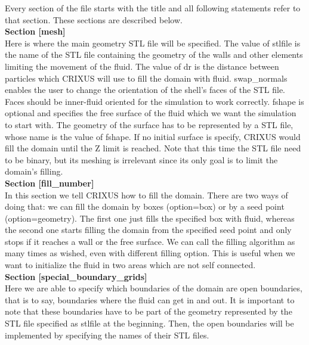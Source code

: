 Every section of the file starts with the title \cmd{[XXX]} 
and all following statements refer to that section.
These sections are described below.\\

\textbf{Section [mesh]}\\
Here is where the main geometry STL file will be specified. 
The value of stlfile is the name of the STL file containing 
the geometry of the walls and other elements limiting 
the movement of the fluid. 
The value of dr is the distance between particles 
which CRIXUS will use to fill the domain with fluid.
swap_normals enables the user to change the orientation 
of the shell’s faces of the STL file. Faces should be 
inner-fluid oriented for the simulation to work correctly.
fshape is optional and specifies the free surface of 
the fluid which we want the simulation to start with. 
The geometry of the surface has to be represented by a STL file, 
whose name is the value of fshape. If no initial surface is 
specify, CRIXUS would fill the domain until the Z limit 
is reached. Note that this time the STL file need to be binary, 
but its meshing is irrelevant since its only goal 
is to limit the domain’s filling.\\

\textbf{Section [fill\_number]}\\
In this section we tell CRIXUS how to fill the domain. 
There are two ways of doing that: we can fill the domain by boxes 
(option=box) or by a seed point (option=geometry).  The first one 
just fills the specified box with fluid, whereas the second 
one starts filling the domain from the specified seed point 
and only stops if it reaches a wall or the free surface. 
We can call the filling algorithm as many times as wished, 
even with different filling option. 
This is useful when we want to initialize the fluid 
in two areas which are not self connected. \\

\textbf{Section [special\_boundary\_grids]}\\
Here we are able to specify which boundaries of 
the domain are open boundaries, that is to say, 
boundaries where the fluid can get in and out. 
It is important to note that these boundaries have 
to be part of the geometry represented by the STL 
file specified as stlfile at the beginning. 
Then, the open boundaries will be implemented by specifying 
the names of their STL files.\\

